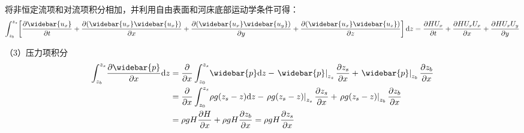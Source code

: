 将非恒定流项和对流项积分相加，并利用自由表面和河床底部运动学条件可得：
\begin{equation}
    \int_{z_{b}}^{ z_{s}}\!
    \left[
  \frac{\partial \widebar{u_{x}}}{\partial t} +
  \frac{\partial (\widebar{u_{x}}\widebar{u_{x}})}{\partial x} +
  \frac{\partial (\widebar{u_{x}}\widebar{u_{y}})}{\partial y} +
  \frac{\partial (\widebar{u_{x}}\widebar{u_{z}})}{\partial z}
  \right]
  \mathrm{d}z
=
\frac{\partial HU_{x}}{\partial t}
+
\frac{\partial HU_{x}U_{x}}{\partial x}
+
\frac{\partial HU_{x}U_{y}}{\partial y}
\end{equation}

（3）压力项积分
\begin{equation}
  \begin{aligned}
    \int_{z_{b}}^{ z_{s}}\!
    \frac{\partial \widebar{p}}{\partial x}
    \mathrm{d}z
    &=
    \frac{\partial}{\partial x}
    \int_{z_0}^{ z_{s}}\!
    \widebar{p}
    \mathrm{d}z
    -
    \left.\widebar{p}\right|_{z_{s}}\frac{\partial  z_{s}}{\partial x}
    +
    \left.\widebar{p}\right|_{z_{b}}\frac{\partial z_{b}}{\partial x}
      \\
    &=
    \frac{\partial}{\partial x}
    \int_{z_0}^{ z_{s}}\!
    \rho g( z_{s}-z)
    \mathrm{d}z
    -
    \left.\rho g( z_{s}-z)\right|_{z_{s}}\frac{\partial  z_{s}}{\partial x}
    +
    \left.\rho g( z_{s}-z)\right|_{z_{b}}\frac{\partial z_{b}}{\partial x}
      \\
    &=
    \rho gH\frac{\partial H}{\partial x} 
    +
    \rho gH\frac{\partial z_{b}}{\partial x} 
    =
    \rho gH\frac{\partial  z_{s}}{\partial x} 
  \end{aligned}
\end{equation}


